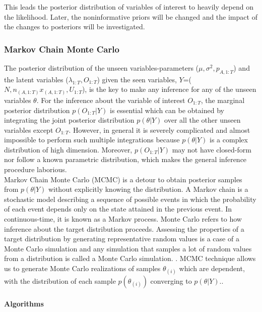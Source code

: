 \documentclass[12pt]{article}
\begin{document}
{This leads the posterior distribution of variables of interest to heavily depend on the likelihood. Later, the noninformative priors will be changed and the impact of the changes to posteriors will be investigated. 

\subsubsection{Markov Chain Monte Carlo}

The posterior distribution of the unseen variables-parameters ($\mu, \sigma^2, p_{A,1:T}$) and the latent variables ($\lambda_{1:T}, O_{1:T}$) given the seen variables, $Y$=($N, n_{(A,1:T)} x_{(A,1:T)}, U_{1:T}$), is the key to make any inference for any of the unseen variables $\theta$. For the inference about the variable of interest $O_{1:T}$, the marginal posterior distribution $p(O_{1:T}|Y)$ is essential which can be obtained by integrating the joint posterior distribution $p(\theta|Y)$ over all the other unseen variables except $O_{1:T}$. However, in general it is severely complicated and almost impossible to perform such multiple integrations because $p(\theta|Y)$ is a complex distribution of high dimension. Moreover, $p(O_{1:T}|Y)$ may not have closed-form nor follow a known parametric distribution, which makes the general inference procedure laborious.\\ 
 
Markov Chain Monte Carlo (MCMC) is a detour to obtain posterior samples from $p(\theta|Y)$ without explicitly knowing the distribution.  A Markov chain is a stochastic model describing a sequence of possible events in which the probability of each event depends only on the state attained in the previous event. In continuous-time, it is known as a Markov process. \cite{markov} Monte Carlo refers to how inference about the target distribution proceeds. Assessing the properties of a target distribution by generating representative random values is a case of a Monte Carlo simulation and any simulation that samples a lot of random values from a distribution is called a Monte Carlo simulation. \cite{gill}. MCMC technique allows us to generate Monte Carlo realizations of samples $\theta_{(i)}$ which are dependent, with the distribution of each sample $p(\theta_{(i)})$ converging to $p(\theta|Y)$.\cite{paul}.

\paragraph{Algorithms}

}
\end{document}
